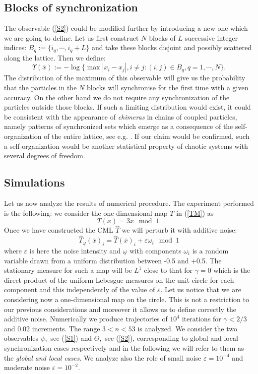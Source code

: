 \documentclass[12pt,reqno,a4paper]{amsart}
\let\epsilon\varepsilon
\newcommand{\T}{{\mathcal{T}}}
\def\o{\omega}   \def\O{\Omega}
\def\ox{\overline{x}}
\def\O{\ensuremath{O}}
\def\o{\ensuremath{\underline{\omega}}}
\def\T{\hat{T}}
\begin{document}
\subsection{Blocks of synchronization}
    The observable (\ref{S2}) could be modified further by introducing a  new one which we are going to define. Let us first construct $N$ blocks of $L$ successive integer indices: $B_q:=\{i_q, \cdots, i_q+L\}$ and take these blocks disjoint and possibly scattered along the lattice.  Then we define:
    $$
    \Upsilon(\ox):=-\log\{\max|x_i-x_j|, i\neq j: (i,j)\in B_q, q=1,\cdots, N \}.
    $$
The distribution of the maximum of this observable will give us the probability that the particles in the $N$ blocks will synchronise for the first time with a given accuracy. On the other hand we do not require any synchronization of the particles outside those blocks. If such a limiting distribution would exist, it could be consistent with the appearance of {\em chimeras} in chains of coupled particles, namely patterns of synchronized sets which emerge as a consequence of the self-organization of the entire lattice, see e.g. \cite{NPRL}. If our claim would be confirmed, such a self-organization would be  another statistical property of chaotic systems with several degrees of freedom. \\


\subsection{Simulations}
Let us now analyze the results of numerical procedure. The experiment performed is the following: we consider the one-dimensional map  $T$ in (\ref{TM}) as
$$T(x)=3x \mod 1. $$
Once we have constructed the CML $\hat{T}$ we will perturb it with additive noise:
$$\T_{\o}(\overline{x})_i=\hat{T}(\ox)_i +\epsilon\omega_i\mod 1 $$ where $\epsilon$ is here the noise intensity and $\o$ with components $\omega_i$ is a random variable drawn from a uniform distribution between -0.5 and +0.5. The stationary measure
for such a map will be $L^1$ close to that for $\gamma=0$ which is the direct product of  the uniform Lebesgue measures on the unit circle for each component and this independently
of the value of $\epsilon.$ Let us  notice that we are considering now  a one-dimensional map on the circle. This is not a restriction to our previous considerations and moreover it allows us to define correctly the additive noise. Numerically we produce trajectories of $10^4$ iterations for $\gamma<2/3$ and 0.02 increments. The range $3<n<53$ is analyzed. We consider the two observables $\psi,$ see (\ref{S1}) and $\Theta,$  see (\ref{S2}), corresponding  to global and local synchronization cases respectively and in the following we will refer to them as the {\em global and local cases}.  We analyze also the role of small noise $\epsilon=10^{-4}$ and moderate noise $\epsilon=10^{-2}$.\\
\end{document}
